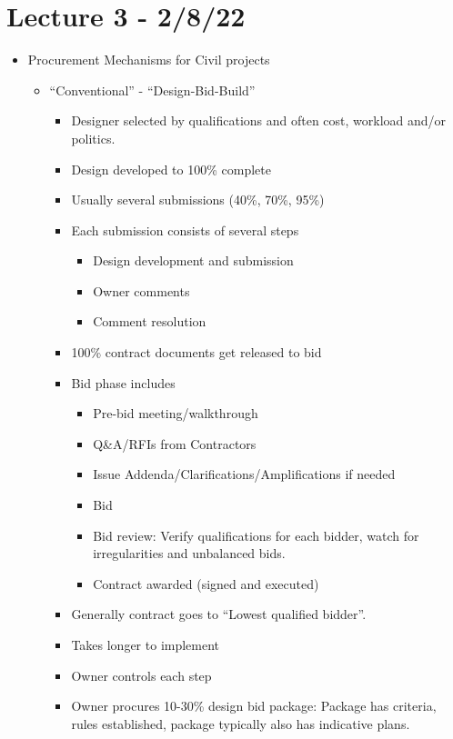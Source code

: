 \documentclass{article}
\begin{document}
\section*{Lecture 3 - 2/8/22}
\begin{itemize}
    \item Procurement Mechanisms for Civil projects
    \begin{itemize}
        \item ``Conventional'' - ``Design-Bid-Build''
        \begin{itemize}
            \item Designer selected by qualifications and often cost, workload and/or politics.
            \item Design developed to 100\% complete
            \item Usually several submissions (40\%, 70\%, 95\%)
            \item Each submission consists of several steps
            \begin{itemize}
                \item Design development and submission
                \item Owner comments
                \item Comment resolution
            \end{itemize}
            \item 100\% contract documents get released to bid
            \item Bid phase includes
            \begin{itemize}
                \item Pre-bid meeting/walkthrough
                \item Q\&A/RFIs from Contractors
                \item Issue Addenda/Clarifications/Amplifications if needed
                \item Bid
                \item Bid review: Verify qualifications for each bidder, watch for irregularities and unbalanced bids.
                \item Contract awarded (signed and executed)
            \end{itemize}
            \item Generally contract goes to ``Lowest qualified bidder''.
            \item Takes longer to implement
            \item Owner controls each step
            \item Owner procures 10-30\% design bid package: Package has criteria, rules established, package typically also has indicative plans.

\end{itemize}
\end{itemize}
\end{itemize}
\end{document}
